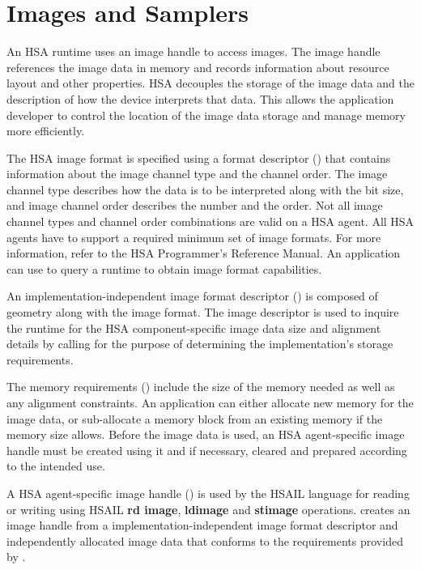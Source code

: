 \documentclass[final]{book}
\newcommand{\reffun}[1]{\textbf{#1}}
\newcommand{\refhsl}[1]{\reffun{#1}}
\begin{document}
\section{Images and Samplers}\label{images}

An HSA runtime uses an image handle  to access
images. The image handle references the image data in memory and records
information about resource layout and other properties. HSA decouples the
storage of the image data and the description of how the device interprets that
data. This allows the application developer to control the location of the
image data storage and manage memory more efficiently.

The HSA image format is specified using a format descriptor
() that contains information about the image
channel type and the channel order. The image channel type describes how the
data is to be interpreted along with the bit size, and image channel order
describes the number and the order. Not all image channel types and channel
order combinations are valid on a HSA agent. All HSA agents have to support a
required minimum set of image formats. For more information, refer to the HSA
Programmer's Reference Manual\cite{prm}. An application can use
 to query a runtime
to obtain image format capabilities.

An implementation-independent image format descriptor
() is composed of geometry along with the
image format. The image descriptor is used to inquire the runtime for the HSA
component-specific image data size and alignment details by calling
 for the purpose of determining the
implementation's storage requirements.

The memory requirements () include the size of the
memory needed as well as any alignment constraints. An application can either
allocate new memory for the image data, or sub-allocate a memory block from an
existing memory if the memory size allows. Before the image data is used, an HSA
agent-specific image handle must be created using it and if necessary, cleared
and prepared according to the intended use.

A HSA agent-specific image handle () is used by
the HSAIL language for reading or writing using HSAIL \refhsl{rd image},
\refhsl{ldimage} and \refhsl{stimage}
operations.  creates an image handle from a
implementation-independent image format descriptor and independently allocated
image data that conforms to the requirements provided by
.
\end{document}

